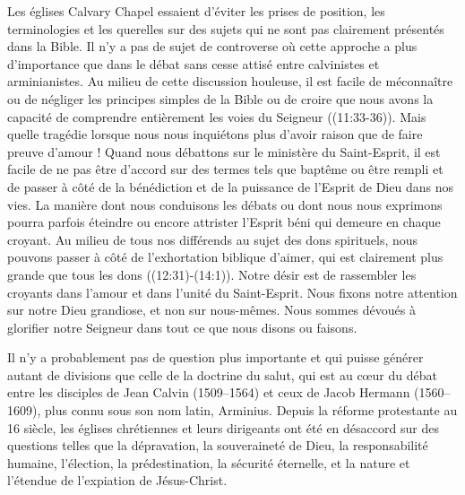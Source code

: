 \begin{specialpar}{}
Les églises Calvary Chapel essaient \pocketlinebreak
 d'éviter les prises de position, les terminologies et les querelles
 sur des sujets qui ne sont pas clairement présentés dans la Bible.
 Il n'y a pas de sujet de controverse où cette approche a plus d'importance
 que dans le débat sans cesse attisé entre calvinistes et arminianistes.
 Au milieu de cette discussion houleuse, il est facile de méconnaître ou de négliger
 les principes simples de la Bible ou de croire que nous avons la capacité
 de comprendre entièrement les voies du Seigneur
 ((11:33-36)).
 Mais quelle tragédie lorsque nous nous inquiétons plus d'avoir \og raison \fg{}
 que de faire preuve d'amour !
 Quand nous débattons sur le ministère du Saint-Esprit, il est facile de ne pas être d'accord
 sur des termes tels que \og baptême \fg{} ou \og être rempli \fg{} 
 et de passer à côté de la bénédiction et de la puissance de l'Esprit de Dieu dans nos vies.
 La manière dont nous conduisons les débats ou dont nous nous exprimons pourra parfois
 \og éteindre \fg{} ou encore \og attrister\fg{} l'Esprit béni qui demeure en chaque croyant.
 Au milieu de tous nos différends au sujet des dons spirituels,
 nous pouvons passer à côté de l'exhortation biblique d'aimer,
 qui est clairement plus grande que tous les dons ((12:31)-(14:1)).
 Notre désir est de rassembler les croyants dans l'amour et dans l'unité du Saint-Esprit.
 Nous fixons notre attention sur notre Dieu grandiose, et non sur
 nous-mêmes.
 Nous sommes dévoués à glorifier notre Seigneur dans tout ce que nous disons ou faisons.
\end{specialpar}

\begin{specialpar}{}
Il n'y a probablement pas de question plus importante et qui puisse générer autant
 de divisions que celle de la doctrine du salut, qui est au cœur du débat
 entre les disciples de Jean Calvin (1509--1564) et ceux de Jacob Hermann (1560--1609),
 plus connu sous son nom latin, Arminius.
 Depuis la réforme protestante au 16 siècle, les églises chrétiennes
 et leurs dirigeants ont été en désaccord sur des questions telles que la dépravation,
 la souveraineté de Dieu, la responsabilité humaine, l'élection,
 la prédestination, la sécurité éternelle,
 et la nature et l'étendue de l'expiation de Jésus-Christ.
\end{specialpar}

